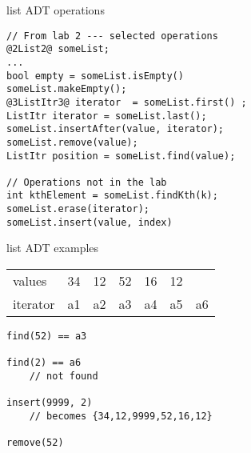 \begin{frame}[fragile,label=listAdt]{list ADT operations}
\begin{lstlisting}
// From lab 2 --- selected operations
@2List2@ someList;
...
bool empty = someList.isEmpty()
someList.makeEmpty();
@3ListItr3@ iterator  = someList.first() ;
ListItr iterator = someList.last();
someList.insertAfter(value, iterator);
someList.remove(value);
ListItr position = someList.find(value);

// Operations not in the lab
int kthElement = someList.findKth(k);
someList.erase(iterator);
someList.insert(value, index)
\end{lstlisting}
\end{frame}

\begin{frame}[fragile,label=listAdtExample]{list ADT examples}
\begin{tabular}{l|llllll}
values & 34 & 12 & 52 & 16 & 12 \\
iterator & a1 & a2 & a3 & a4 & a5 & a6 \\
\end{tabular}
\begin{lstlisting}
find(52) == a3

find(2) == a6
    // not found

insert(9999, 2) 
    // becomes {34,12,9999,52,16,12}

remove(52)
\end{lstlisting}
\end{frame}

